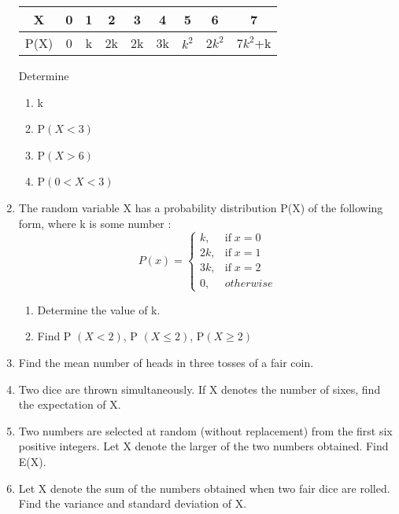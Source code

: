 \documentclass[12pt]{article}
\begin{document}
\begin{enumerate}
 \begin{tabular}{|c|c|c|c|c|c|c|c|c|}
    \hline
    \cellcolor{blue!30}X & \cellcolor{blue!40}0& \cellcolor{blue!30}1& \cellcolor{blue!30}2& \cellcolor{blue!40}3& \cellcolor{blue!40}4 & \cellcolor{blue!30}5& \cellcolor{blue!30}6& \cellcolor{blue!30}7 \\
    \hline
    \cellcolor{blue!30}P(X) & \cellcolor{blue!30}0& \cellcolor{blue!40}k& \cellcolor{blue!30}2k& \cellcolor{blue!30}2k& \cellcolor{blue!40}3k& \cellcolor{blue!30}$k^2$& \cellcolor{blue!40}2$k^2$& \cellcolor{blue!30}7$k^2$+k \\
    \hline
\end{tabular}

Determine
\begin{enumerate}
\item k
\item P$(X < 3)$
\item P$(X > 6)$
\item P$(0 < X < 3)$

\end{enumerate}

\item The random variable X has a probability distribution P(X) of the following form,
where k is some number :
\[P(x)=\begin{cases}
k, & \mbox{if}\; x= 0\\
2k, & \mbox{if}\; x= 1\\
3k, & \mbox{if}\; x= 2\\
0, & otherwise
\end{cases}\]
\begin{enumerate}[label=\alph*]
\item Determine the value of k.
\item Find P $(X < 2)$, P $(X \leq 2)$, P$(X \geq 2)$
\end{enumerate}
\item Find the mean number of heads in three tosses of a fair coin.

\item Two dice are thrown simultaneously. If X denotes the number of sixes, find the
expectation of X.

\item Two numbers are selected at random (without replacement) from the first six
positive integers. Let X denote the larger of the two numbers obtained. Find
E(X).

\item Let X denote the sum of the numbers obtained when two fair dice are rolled.
Find the variance and standard deviation of X.


\end{enumerate}
\end{document}
